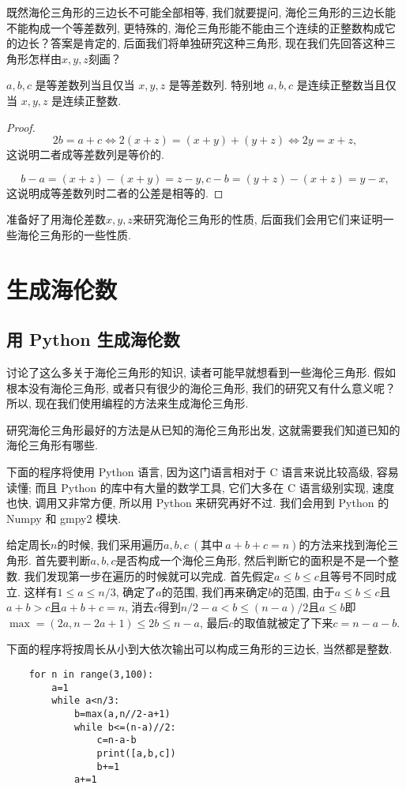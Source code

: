 \documentclass[12pt]{article}
\begin{document}
既然海伦三角形的三边长不可能全部相等, 我们就要提问, 海伦三角形的三边长能不能构成一个等差数列, 更特殊的, 海伦三角形能不能由三个连续的正整数构成它的边长？答案是肯定的, 后面我们将单独研究这种三角形, 现在我们先回答这种三角形怎样由$x,y,z$刻画？
    
\begin{theorem}
    $a,b,c$ 是等差数列当且仅当 $x,y,z$ 是等差数列. 特别地 $a,b,c$ 是连续正整数当且仅当 $x,y,z$ 是连续正整数. 
\end{theorem}
\begin{proof}
    \[2b=a+c\iff2(x+z)=(x+y)+(y+z)\iff 2y=x+z, \]
    这说明二者成等差数列是等价的. \par
    \[b-a=(x+z)-(x+y)=z-y, c-b=(y+z)-(x+z)=y-x, \]
    这说明成等差数列时二者的公差是相等的. 
\end{proof}

准备好了用海伦差数$x,y,z$来研究海伦三角形的性质, 后面我们会用它们来证明一些海伦三角形的一些性质. 

\section{生成海伦数}
\subsection{用 Python 生成海伦数}
讨论了这么多关于海伦三角形的知识, 读者可能早就想看到一些海伦三角形. 假如根本没有海伦三角形, 或者只有很少的海伦三角形, 我们的研究又有什么意义呢？所以, 现在我们使用编程的方法来生成海伦三角形. 
    
研究海伦三角形最好的方法是从已知的海伦三角形出发, 这就需要我们知道已知的海伦三角形有哪些. 

下面的程序将使用 Python 语言, 因为这门语言相对于 C 语言来说比较高级, 容易读懂; 而且 Python 的库中有大量的数学工具, 它们大多在 C 语言级别实现, 速度也快, 调用又非常方便, 所以用 Python 来研究再好不过. 我们会用到 Python 的 Numpy 和 gmpy2 模块. 

给定周长$n$的时候, 我们采用遍历$a,b,c\ (\text{其中}\ a+b+c=n)$的方法来找到海伦三角形. 首先要判断$a,b,c$是否构成一个海伦三角形, 然后判断它的面积是不是一个整数. 我们发现第一步在遍历的时候就可以完成. 首先假定$a\le b\le c$且等号不同时成立. 这样有$1\le a\le n/3$, 确定了$a$的范围, 我们再来确定$b$的范围, 由于$a\le b\le c$且$a+b>c$且$a+b+c=n$, 消去$c$得到$n/2-a<b\le(n-a)/2$且$a\le b$即$\max=(2a,n-2a+1)\le2b\le n-a$, 最后$c$的取值就被定了下来$c=n-a-b$. 

下面的程序将按周长从小到大依次输出可以构成三角形的三边长, 当然都是整数. 
\begin{verbatim}
    for n in range(3,100):
        a=1
        while a<n/3:
            b=max(a,n//2-a+1)
            while b<=(n-a)//2:
                c=n-a-b
                print([a,b,c])
                b+=1
            a+=1    
\end{verbatim}
\end{document}
